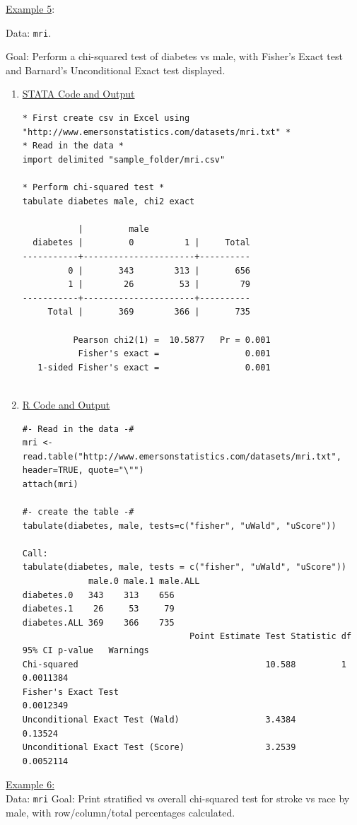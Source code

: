 \documentclass[11pt,letterpaper,fleqn]{report}
\begin{document}
\underline{Example 5}:

Data: \texttt{mri}.

Goal: Perform a chi-squared test of diabetes vs male, with Fisher's Exact test and Barnard's Unconditional Exact test displayed.

\begin{enumerate}[]
\item \underline{STATA Code and Output}
{\scriptsize
\begin{verbatim}
* First create csv in Excel using "http://www.emersonstatistics.com/datasets/mri.txt" *
* Read in the data *
import delimited "sample_folder/mri.csv"

* Perform chi-squared test *
tabulate diabetes male, chi2 exact

           |         male
  diabetes |         0          1 |     Total
-----------+----------------------+----------
         0 |       343        313 |       656 
         1 |        26         53 |        79 
-----------+----------------------+----------
     Total |       369        366 |       735 

          Pearson chi2(1) =  10.5877   Pr = 0.001
           Fisher's exact =                 0.001
   1-sided Fisher's exact =                 0.001


\end{verbatim}}

\newpage
\item \underline{R Code and Output}
{\scriptsize
\begin{verbatim}
#- Read in the data -#
mri <- read.table("http://www.emersonstatistics.com/datasets/mri.txt", header=TRUE, quote="\"")
attach(mri)

#- create the table -#
tabulate(diabetes, male, tests=c("fisher", "uWald", "uScore"))

Call:
tabulate(diabetes, male, tests = c("fisher", "uWald", "uScore"))
             male.0 male.1 male.ALL
diabetes.0   343    313    656     
diabetes.1    26     53     79     
diabetes.ALL 369    366    735     
                                 Point Estimate Test Statistic df 95% CI p-value   Warnings
Chi-squared                                     10.588         1         0.0011384         
Fisher's Exact Test                                                      0.0012349         
Unconditional Exact Test (Wald)                 3.4384                   0.13524           
Unconditional Exact Test (Score)                3.2539                   0.0052114    
\end{verbatim}}
\end{enumerate}
\underline{Example 6:}\\
Data: \texttt{mri}
Goal: Print stratified vs overall chi-squared test for stroke vs race by male, with row/column/total percentages calculated.
\end{document}
